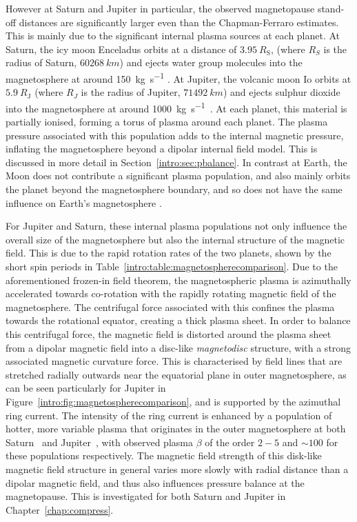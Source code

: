 However at Saturn and Jupiter in particular, the observed magnetopause stand-off distances are significantly larger even than the Chapman-Ferraro estimates. This is mainly due to the significant internal plasma sources at each planet. At Saturn, the icy moon Enceladus orbits at a distance of $\SI{3.95}{R_\mathrm{S}}$, (where $\si{R_S}$ is the radius of Saturn, $\SI{60268}{km}$) and ejects water group molecules into the magnetosphere at around \SI{150}{kg s^{-1}} \citep{tokar2006,dougherty2006}. At Jupiter, the volcanic moon Io orbits at $\SI{5.9}{R_\mathrm{J}}$ (where $\si{R_J}$ is the radius of Jupiter, $\SI{71492}{km}$) and ejects sulphur dioxide into the magnetosphere at around \SI{1000}{kg s^{-1}}~\citep{bagenal2011}. At each planet, this material is partially ionised, forming a torus of plasma around each planet. The plasma pressure associated with this population adds to the internal magnetic pressure, inflating the magnetosphere beyond a dipolar internal field model. This is discussed in more detail in Section~\ref{intro:sec:pbalance}. In contrast at Earth, the Moon does not contribute a significant plasma population, and also mainly orbits the planet beyond the magnetosphere boundary, and so does not have the same influence on Earth's magnetosphere  \citep[e.g.][]{schneider1967}.

For Jupiter and Saturn, these internal plasma populations not only influence the overall size of the magnetosphere but also the internal structure of the magnetic field. This is due to the rapid rotation rates of the two planets, shown by the short spin periods in Table~\ref{intro:table:magnetospherecomparison}. Due to the aforementioned frozen-in field theorem, the magnetospheric plasma is azimuthally accelerated towards co-rotation with the rapidly rotating magnetic field of the magnetosphere. The centrifugal force associated with this confines the plasma towards the rotational equator, creating a thick plasma sheet. In order to balance this centrifugal force, the magnetic field is distorted around the plasma sheet from a dipolar magnetic field into a disc-like \textit{magnetodisc} structure, with a strong associated magnetic curvature force. This is characterised by field lines that are stretched radially outwards near the equatorial plane in outer magnetosphere, as can be seen particularly for Jupiter in Figure~\ref{intro:fig:magnetospherecomparison}, and is supported by the azimuthal ring current. The intensity of the ring current is enhanced by a population of hotter, more variable plasma that originates in the outer magnetosphere at both Saturn~\citep[e.g.][]{sergis2010} and Jupiter~\citep[e.g.][]{mauk2004}, with observed plasma $\beta$ of the order $2-5$ and ${\sim}100$ for these populations respectively. The magnetic field strength of this disk-like magnetic field structure in general varies more slowly with radial distance than a dipolar magnetic field, and thus also influences pressure balance at the magnetopause. This is investigated for both Saturn and Jupiter in Chapter~\ref{chap:compress}. 

